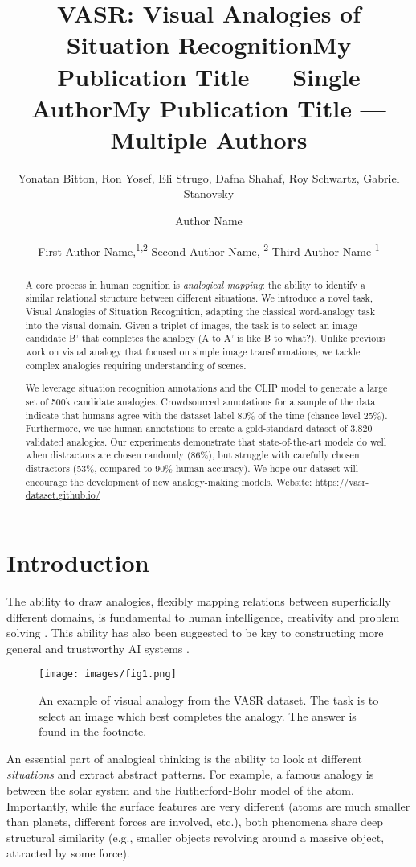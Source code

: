 \documentclass[letterpaper]{article} \usepackage{aaai23}  \usepackage{times}  \usepackage{helvet}  \usepackage{courier}  \usepackage[hyphens]{url}  \usepackage{graphicx} \urlstyle{rm} \def\UrlFont{\rm}  \usepackage{natbib}  \usepackage{caption} \frenchspacing  \setlength{\pdfpagewidth}{8.5in}  \setlength{\pdfpageheight}{11in}  \usepackage{algorithm}
\title{VASR: Visual Analogies of Situation Recognition}
\author {
Yonatan Bitton,
    Ron Yosef, 
    Eli Strugo,
    Dafna Shahaf,
    Roy Schwartz,
    Gabriel Stanovsky
}
\title{My Publication Title --- Single Author}
\author {
    Author Name
}
\title{My Publication Title --- Multiple Authors}
\author {
First Author Name,\textsuperscript{\rm 1,\rm 2}
    Second Author Name, \textsuperscript{\rm 2}
    Third Author Name \textsuperscript{\rm 1}
}
\begin{document}
\maketitle

\begin{abstract}
A core process in human cognition is \emph{analogical mapping}: the ability to identify a similar relational structure between different situations.
We introduce a novel task, Visual Analogies of Situation Recognition, adapting the classical word-analogy task into the visual domain. Given a triplet of images, the task is to select an image candidate B' that completes the analogy (A to A' is like B to what?). Unlike previous work on visual analogy that focused on simple image transformations, we tackle complex analogies requiring understanding of scenes. 

We leverage situation recognition annotations and the CLIP model to generate a large set of 500k candidate analogies. Crowdsourced  annotations for a sample of the data indicate that humans agree with the dataset label 80\% of the time (chance level 25\%). Furthermore, we use human annotations to create a gold-standard dataset of 3,820 validated analogies.
Our experiments demonstrate that state-of-the-art models do well when distractors are chosen randomly (86\%), but struggle with carefully chosen distractors (53\%, compared to 90\% human accuracy). We hope our dataset will encourage the development of new analogy-making models. Website: \url{https://vasr-dataset.github.io/}
\end{abstract}

\section{Introduction}
The ability to draw analogies, flexibly mapping relations between superficially different domains, is fundamental to human intelligence, creativity and problem solving \cite{hofstadter2013surfaces,depeweg2018solving,goodman2014concepts,fauconnier1997mappings,gentner2001analogical,carey2011precis,spelke2007core}. This ability has also been suggested to be key to constructing more general and trustworthy AI systems \cite{mitchell2021abstraction,mccarthy2006proposal}. 
\begin{figure}[!tb]
\centering
\newcommand{\figlen}[0]{\columnwidth}
    \texttt{[image: images/fig1.png]}\\
    \caption{An example of visual analogy from the VASR dataset. The task is to select an image which best completes the analogy. The answer is found in the footnote.}
    \label{fig:fig1}
\end{figure}
An essential part of analogical thinking is the ability to 
look at different \emph{situations} and extract abstract patterns. For example, a famous analogy is between the solar system and the Rutherford-Bohr model of the
atom. Importantly, while the surface features are very different (atoms are much smaller than planets, different forces are involved, etc.), both phenomena share deep structural similarity (e.g., smaller objects revolving around a massive object, attracted by some force).
\end{document}
